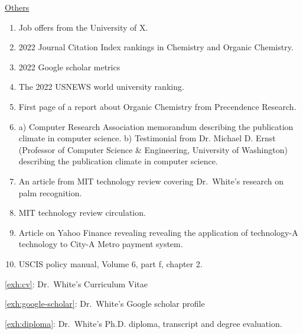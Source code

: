\documentclass{article}
\newcommand{\lname}{White}
\newcommand{\drfn}{Dr.~\lname}
\newcommand{\cs}{Chemistry}
\newcommand{\oc}{Organic Chemistry}
\newcounter{exhibit}
\begin{document}
\underline{Others}
\begin{enumerate}[resume]
    \item Job offers from the University of X.\label{exh:offers-univ-x}
    \item 2022 Journal Citation Index rankings in \cs{} and \oc.\label{exh:jcr}
    \item 2022 Google scholar metrics\label{exh:gscholar-metrics}
    \item The 2022 USNEWS world university ranking.\label{exh:usnews-ranking}
    \item First page of a report about \oc{} from Precendence Research.\label{exh:precedence}
    \item a) Computer Research Association memorandum describing the publication climate in computer science.\label{exh:cs-pub-climate}
    b) Testimonial from Dr. Michael D. Ernst (Professor of Computer Science \& Engineering, University of Washington) describing the publication climate in computer science.\label{exh:pub-climate-cs}
    \item An article from MIT technology review covering \drfn's research on palm recognition.\label{exh:mit}
    \item MIT technology review circulation. \label{exh:mit-circulation}
    \item Article on Yahoo Finance revealing revealing the application of technology-A technology to City-A Metro payment system.\label{exh:yahoo}
    \item USCIS policy manual, Volume 6, part f, chapter 2. \label{exh:uscis-policy-manual}
\end{enumerate}

\pagebreak
\begin{center}
    \Large{\ref{exh:cv}: \drfn's Curriculum Vitae}
\end{center}
% 

\pagebreak
\begin{center}
    \Large{\ref{exh:google-scholar}: \drfn's Google scholar profile}
\end{center}
% 

\pagebreak
\begin{center}
    \Large{\ref{exh:diploma}: \drfn's Ph.D. diploma, transcript and degree evaluation.}
\end{center}
% 
\pagebreak
\end{document}
